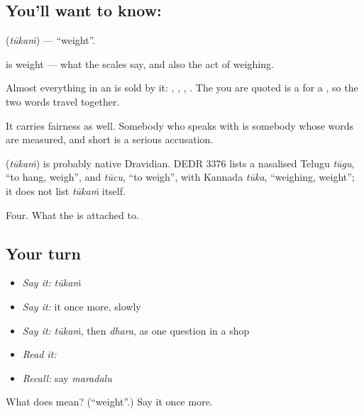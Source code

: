 \subsection*{You'll want to know: }
\textbf{} (\emph{tūkaṁ}) — \textquotedblleft{}weight\textquotedblright{}.

 is weight — what the scales say, and also the act of weighing.

Almost everything in an  is sold by it: , , , . The  you are quoted is a  for a , so the two words travel together.

It carries fairness as well. Somebody who speaks with  is somebody whose words are measured, and short  is a serious accusation.

\begin{cousinweb}
\textbf{} (\emph{tūkaṁ}) is probably native Dravidian. DEDR 3376 lists a nasalised Telugu \emph{tūgu}, \textquotedblleft{}to hang, weigh\textquotedblright{}, and \emph{tūcu}, \textquotedblleft{}to weigh\textquotedblright{}, with Kannada \emph{tūka}, \textquotedblleft{}weighing, weight\textquotedblright{}; it does not list \emph{tūkaṁ} itself.
\end{cousinweb}

\begin{grammarlens}[title={What you've built}]
Four. What the  is attached to.
\end{grammarlens}

\subsection*{Your turn}
\begin{itemize}
\raggedright
  \item \emph{Say it:} \emph{tūkaṁ}
  \item \emph{Say it:} it once more, slowly
  \item \emph{Say it:} \emph{tūkaṁ}, then \emph{dhara}, as one question in a shop
  \item \emph{Read it:} \textbf{}
  \item \emph{Recall:} say \emph{maradalu}
\end{itemize}

\begin{tcolorbox}[breakable,colback=teal!4,colframe=teal!35!black,title={Before you move on}]
What does  mean? (\textquotedblleft{}weight\textquotedblright{}.) Say it once more.
\end{tcolorbox}
